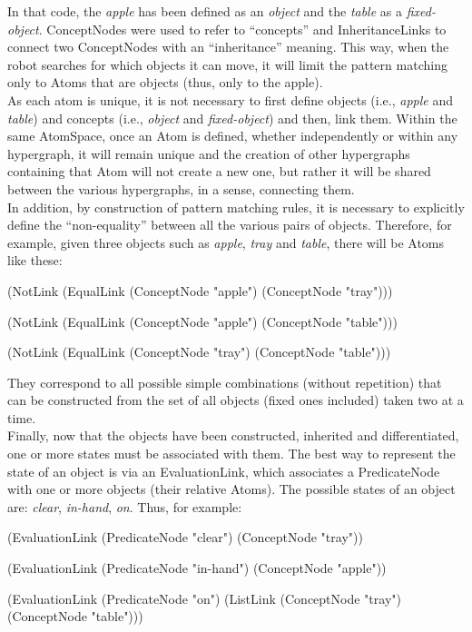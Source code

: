 In that code, the \textit{apple} has been defined as an \textit{object} and the \textit{table} as a \textit{fixed-object}. 
ConceptNodes were used to refer to \enquote{concepts} and InheritanceLinks to connect two ConceptNodes with an \enquote{inheritance} meaning. This way, when the robot searches for which objects it can move, it will limit the pattern matching only to Atoms that are objects (thus, only to the apple). \\
As each atom is unique, it is not necessary to first define objects (i.e., \textit{apple} and \textit{table}) and concepts (i.e., \textit{object} and \textit{fixed-object}) and then, link them. Within the same AtomSpace, once an Atom is defined, whether independently or within any hypergraph, it will remain unique and the creation of other hypergraphs containing that Atom will not create a new one, but rather it will be shared between the various hypergraphs, in a sense, connecting them. \\

In addition, by construction of pattern matching rules, it is necessary to explicitly define the \enquote{non-equality} between all the various pairs of objects. Therefore, for example, given three objects such as \textit{apple}, \textit{tray} and \textit{table}, there will be Atoms like these: \\
\begin{python}
	(NotLink (EqualLink 
		(ConceptNode "apple") (ConceptNode "tray")))

	(NotLink (EqualLink 
		(ConceptNode "apple") (ConceptNode "table")))

	(NotLink (EqualLink 
		(ConceptNode "tray") (ConceptNode "table")))
\end{python}
They correspond to all possible simple combinations (without repetition) that can be constructed from the set of all objects (fixed ones included) taken two at a time. \\

Finally, now that the objects have been constructed, inherited and differentiated, one or more states must be associated with them. The best way to represent the state of an object is via an EvaluationLink, which associates a PredicateNode with one or more objects (their relative Atoms). The possible states of an object are: \textit{clear}, \textit{in-hand}, \textit{on}. Thus, for example: \\
\begin{python}
	(EvaluationLink
		(PredicateNode "clear")
		(ConceptNode "tray"))
	
	(EvaluationLink
		(PredicateNode "in-hand")
		(ConceptNode "apple"))
	
	(EvaluationLink
		(PredicateNode "on")
		(ListLink
			(ConceptNode "tray")
			(ConceptNode "table")))
\end{python}

